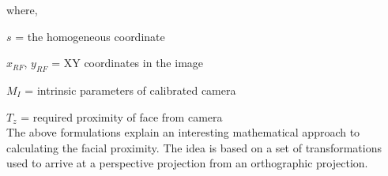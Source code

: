 \documentclass[twoside]{iitbreport}
\begin{document}
where,

\qquad $s$ = the homogeneous coordinate

\qquad $x_{RF}$, $y_{RF}$ = XY coordinates in the image

\qquad $M_I$ = intrinsic parameters of calibrated camera

\qquad $T_z$ = required proximity of face from camera\\

The above formulations explain an interesting mathematical approach to calculating the facial proximity. The idea is based on a set of transformations used to arrive at a perspective projection from an orthographic projection.


     

%             

           


\end{document}
